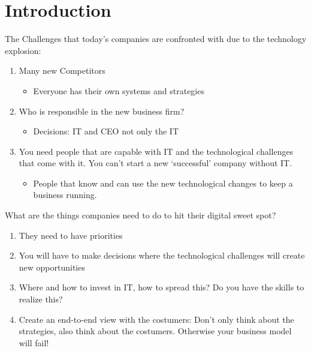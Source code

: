 \documentclass{article}
\begin{document}
\section{Introduction}

The Challenges that today's companies are confronted with due to the technology explosion:

\begin{enumerate}
\item  Many new Competitors

\begin{itemize}
\renewcommand{\labelitemi}{$\Rightarrow$}
\item  Everyone has their own systems and strategies
\end{itemize}

\item  Who is responsible in the new business firm?

\begin{itemize}
\renewcommand{\labelitemi}{$\Rightarrow$}
\item  Decisions: IT and CEO not only the IT
\end{itemize}

\item  You need people that are capable with IT and the technological challenges that come with it. You can't start a new `successful' company without IT. 

\begin{itemize}
\renewcommand{\labelitemi}{$\Rightarrow$}
\item  People that know and can use the new technological changes to keep a business running.
\end{itemize}
\end{enumerate}

What are the things companies need to do to hit their digital sweet spot?

\begin{enumerate}
\item  They need to have priorities

\item  You will have to make decisions where the technological challenges will create new opportunities

\item  Where and how to invest in IT, how to spread this? Do you have the skills to realize this?

\item  Create an end-to-end view with the costumers: Don't only think about the strategies, also think about the costumers. Otherwise your business model will fail!
\end{enumerate}
\end{document}
